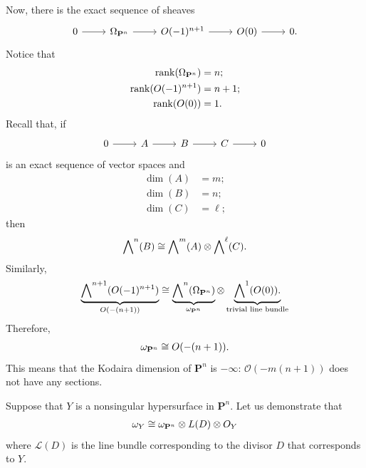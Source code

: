\documentclass [11 pt, oneside] {article}
\begin{document}
Now, there is the exact sequence of sheaves
\[
\begin{tikzcd}[row sep = 0]
	0\ar[r]&\Omega_{\mathbf{P}^n}\ar[r]&\mathscr{O}(-1) ^{n+1} \ar[r]&\mathscr{O}(0)\ar[r]&0.
\end{tikzcd}
\]
Notice that
\begin{align*}
	\operatorname{rank} (\Omega_{\mathbf{P}^n}) &= n;\\
	\operatorname{rank} (\relax{O}(-1) ^{n+1}) &= n+1;\\
	\operatorname{rank} (\relax{O}(0)) &= 1.
\end{align*}
Recall that, if
\[
\begin{tikzcd}
	0\ar[r]&A\ar[r] &B\ar[r]&C\ar[r]&0
\end{tikzcd}
\]
is an exact sequence of vector spaces and 
\begin{align*}
	\dim (A) &= m;\\
	\dim (B) &= n;\\
	\dim (C) &= \ell;
\end{align*}
then
\begin{align*}
	\bigwedge\nolimits^n(B) \cong \bigwedge\nolimits^m  (A)\otimes \bigwedge\nolimits^\ell (C).
\end{align*}
Similarly,
\begin{align*}
	\underbrace{\bigwedge\nolimits^{n+1} (\relax{O}(-1)^{n+1})}_{\relax{O}(-(n+1))} \cong \underbrace{\bigwedge\nolimits^n (\Omega_{\mathbf{P}^n})}_{\omega_{\mathbf{P}^n}} \otimes \underbrace{\bigwedge\nolimits^1 (\relax{O}(0)).}_{\textrm{trivial line bundle}}
\end{align*}
Therefore,
\begin{align*}
	\omega_{\mathbf{P}^n} \cong \relax{O}(-(n+1)).
\end{align*}
This means that the Kodaira dimension of $\mathbf{P}^n$ is $-\infty$: $\mathscr{O}(-m(n+1))$ does not have any sections.

Suppose that $Y$ is a nonsingular hypersurface in $\mathbf{P}^n$. Let us demonstrate that
\begin{align*}
	\omega_Y \cong \omega_{\mathbf{P}^n} \otimes \relax{L}(D)\otimes \relax{O}_Y
\end{align*}
where $\mathscr{L}(D)$ is the line bundle corresponding to the divisor $D$ that corresponds to $Y$.
\end{document}
